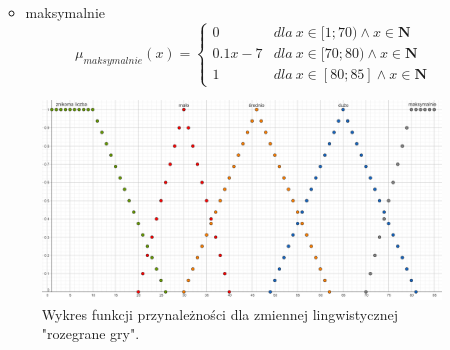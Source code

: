 \documentclass{classrep}
\begin{document}
\begin{enumerate}
\begin{itemize}
\begin{equation}
        \end{equation}
        \item maksymalnie
        \begin{equation}
            \mu_{maksymalnie}(x) = \left\{\begin{matrix} 0 & dla \: x\in [1;70) \wedge x\in \mathbf{N} \\ 0.1x - 7 & dla \: x\in[70;80) \wedge x\in \mathbf{N} \\ 1 & dla \: x\in [80;85] \wedge x\in \mathbf{N} \end{matrix}\right.
        \end{equation}
    \end{itemize}
    \begin{figure}[H]
        \centering
        \includegraphics[width=14cm]{wykres_gry.png}
        \caption{Wykres funkcji przynależności dla zmiennej lingwistycznej "rozegrane gry".}
        \label{rysunek:gry}
    \end{figure}
    

\end{enumerate}
\end{document}
